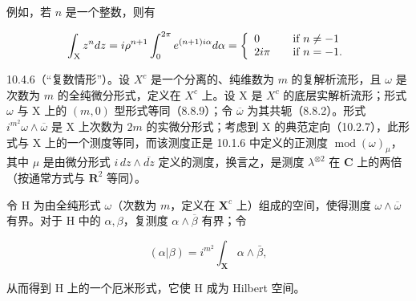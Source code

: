 例如，若 \(n\) 是一个整数，则有

\[
\int_ {\mathrm{X}} z ^ {n} d z = i \rho^ {n + 1} \int_ {0} ^ {2 \pi} e ^ {(n + 1) i \alpha} d \alpha = \left\{ \begin{array}{l l} 0 & \quad \text {if } n \neq - 1 \\ 2 i \pi & \quad \text {if } n = - 1. \end{array} \right.
\]

10.4.6（“复数情形”）。设 \(X^{c}\) 是一个分离的、纯维数为 \(m\) 的复解析流形，且 \(\omega\) 是次数为 \(m\) 的全纯微分形式，定义在 \(X^{c}\) 上。设 X 是 \(X^{c}\) 的底层实解析流形；形式 \(\omega\) 与 X 上的 \((m,0)\) 型形式等同（8.8.9）；令 \(\overline{\omega}\) 为其共轭（8.8.2）。形式 \(i^{m^{2}}\omega \wedge \overline{\omega}\) 是 X 上次数为 \(2m\) 的实微分形式；考虑到 X 的典范定向（10.2.7），此形式与 X 上的一个测度等同，而该测度正是 10.1.6 中定义的正测度 \(\operatorname{mod}(\omega)_{\mu}\)，其中 \(\mu\) 是由微分形式 \(i \, dz \wedge \overline{dz}\) 定义的测度，换言之，是测度 \(\lambda^{\otimes 2}\) 在 \(\mathbf{C}\) 上的两倍（按通常方式与 \(\mathbf{R}^{2}\) 等同）。

令 H 为由全纯形式 \(\omega\)（次数为 \(m\)，定义在 \(\mathbf{X}^c\) 上）组成的空间，使得测度 \(\omega \wedge \overline{\omega}\) 有界。对于 H 中的 \(\alpha, \beta\)，复测度 \(\alpha \wedge \overline{\beta}\) 有界；令

\[
(\alpha | \beta) = i ^ {m ^ {2}} \int_ {\mathbf {X}} \alpha \wedge \bar {\beta},
\]

从而得到 H 上的一个厄米形式，它使 H 成为 Hilbert 空间。

